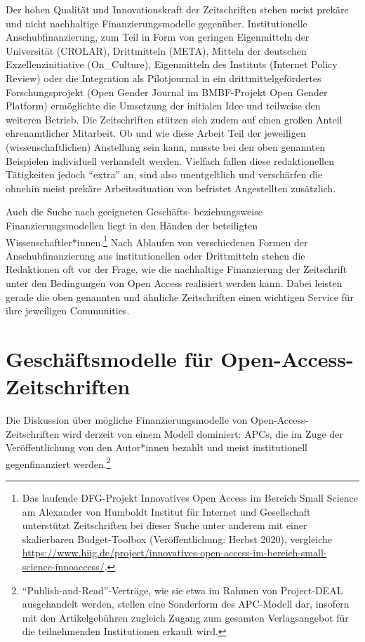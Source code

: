 \documentclass[a4paper,
fontsize=11pt,
oneside,
numbers=noperiodatend,
parskip=half-,
bibliography=totoc,
final
]{scrartcl}
\begin{document}
Der hohen Qualität und Innovationskraft der Zeitschriften stehen meist
prekäre und nicht nachhaltige Finanzierungsmodelle gegenüber.
Institutionelle Anschubfinanzierung, zum Teil in Form von geringen
Eigenmitteln der Universität (CROLAR), Drittmitteln (META), Mitteln der
deutschen Exzellenzinitiative (On\_Culture), Eigenmitteln des Instituts
(Internet Policy Review) oder die Integration als Pilotjournal in ein
drittmittelgefördertes Forschungsprojekt (Open Gender Journal im
BMBF-Projekt Open Gender Platform) ermöglichte die Umsetzung der
initialen Idee und teilweise den weiteren Betrieb. Die Zeitschriften
stützen sich zudem auf einen großen Anteil ehrenamtlicher Mitarbeit. Ob
und wie diese Arbeit Teil der jeweiligen (wissenschaftlichen) Anstellung
sein kann, musste bei den oben genannten Beispielen individuell
verhandelt werden. Vielfach fallen diese redaktionellen Tätigkeiten
jedoch \enquote{extra} an, sind also unentgeltlich und verschärfen die
ohnehin meist prekäre Arbeitssituation von befristet Angestellten
zusätzlich.

Auch die Suche nach geeigneten Geschäfts- beziehungsweise
Finanzierungsmodellen liegt in den Händen der beteiligten
Wissenschaftler*innen.\footnote{Das laufende DFG-Projekt Innovatives
  Open Access im Bereich Small Science am Alexander von Humboldt
  Institut für Internet und Gesellschaft unterstützt Zeitschriften bei
  dieser Suche unter anderem mit einer skalierbaren Budget-Toolbox
  (Veröffentlichung: Herbst 2020), vergleiche
  \url{https://www.hiig.de/project/innovatives-open-access-im-bereich-small-science-innoaccess/}.}
Nach Ablaufen von verschiedenen Formen der Anschubfinanzierung aus
institutionellen oder Drittmitteln stehen die Redaktionen oft vor der
Frage, wie die nachhaltige Finanzierung der Zeitschrift unter den
Bedingungen von Open Access realisiert werden kann. Dabei leisten gerade
die oben genannten und ähnliche Zeitschriften einen wichtigen Service
für ihre jeweiligen Communities.

\hypertarget{geschuxe4ftsmodelle-fuxfcr-open-access-zeitschriften}{%
\section{Geschäftsmodelle für
Open-Access-Zeitschriften}\label{geschuxe4ftsmodelle-fuxfcr-open-access-zeitschriften}}

Die Diskussion über mögliche Finanzierungsmodelle von
Open-Access-Zeitschriften wird derzeit von einem Modell dominiert: APCs,
die im Zuge der Veröffentlichung von den Autor*innen bezahlt und meist
institutionell gegenfinanziert werden.\footnote{\enquote{Publish-and-Read}-Verträge,
  wie sie etwa im Rahmen von Project-DEAL ausgehandelt werden, stellen
  eine Sonderform des APC-Modell dar, insofern mit den Artikelgebühren
  zugleich Zugang zum gesamten Verlagsangebot für die teilnehmenden
  Institutionen erkauft wird.}
\end{document}
